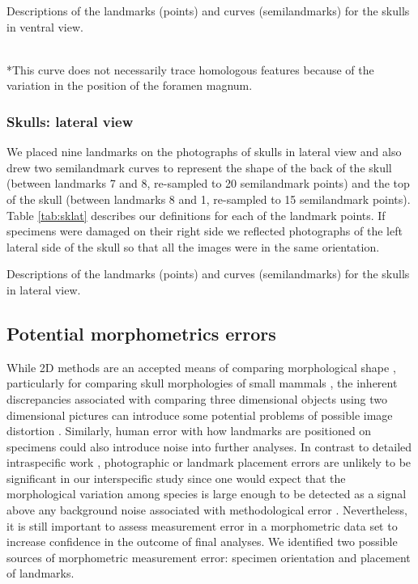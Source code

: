\documentclass[12pt,a4paper]{article}
\begin{document}
\begin{table}[!htb] 
\caption[Skulls: ventral landmarks]
		{Descriptions of the landmarks (points) and curves (semilandmarks) for the skulls in ventral view.} 

\label{tab:skvent}
\\
*This curve does not necessarily trace homologous features because of the variation in the position of the foramen magnum.
\end{table}
	
\newpage
\subsubsection{Skulls: lateral view}
\vspace*{-0.5cm}
	We placed nine landmarks on the photographs of skulls in lateral view and also drew two semilandmark curves to represent the shape of the back of the skull (between landmarks 7 and 8, re-sampled to 20 semilandmark points) and the top of the skull (between landmarks 8 and 1, re-sampled to 15 semilandmark points). Table \ref{tab:sklat} describes our definitions for each of the landmark points.
	If specimens were damaged on their right side we reflected photographs of the left lateral side of the skull so that all the images were in the same orientation.

\begin{table}[!htb]
\caption[Skulls: lateral landmarks]
		{Descriptions of the landmarks (points) and curves (semilandmarks) for the skulls in lateral view.} 

\label{tab:sklat}
\end{table}
\subsection{{Potential morphometrics errors}}
\vspace*{-0.5cm}	 
	While 2D methods are an accepted means of comparing morphological shape \citep[e.g.][]{Adams2004, Mitteroecker2009}, particularly for comparing skull morphologies of small mammals \citep[e.g.][]{Cardini2003, Panchetti2008, White2008, Barrow2008, Scalici2011}, the inherent discrepancies associated with comparing three dimensional objects using two dimensional pictures can introduce some potential problems of possible image distortion \citep{Arnqvist1998}. Similarly, human error with how landmarks are positioned on specimens could also introduce noise into further analyses.
	In contrast to detailed intraspecific work \citep[e.g.][]{Bornholdt2008, Blagojevic2011}, photographic or landmark placement errors are unlikely to be significant in our interspecific study since one would expect that the morphological variation among species is large enough to  be detected as a signal above any background noise associated with methodological error \citep{Arnqvist1998}. Nevertheless, it is still important to assess measurement error in a morphometric data set to increase confidence in the outcome of final analyses.
	We identified two possible sources of morphometric measurement error: specimen orientation and placement of landmarks.
\end{document}
